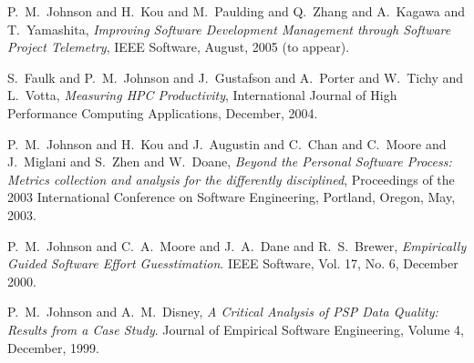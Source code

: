 \documentclass[11pt]{article}
\begin{document}
\begin{Publications: Closely Related}

\item P.~M.~Johnson and H.~Kou and M.~Paulding and Q.~Zhang and A.~Kagawa
and T.~Yamashita, {\em Improving Software Development Management through
Software Project Telemetry}, IEEE Software, August, 2005 (to appear).

\item S.~Faulk and P.~M.~Johnson and J.~Gustafson and A.~Porter and W.~Tichy
and L.~Votta, {\em Measuring HPC Productivity}, International Journal of
High Performance Computing Applications, December, 2004.


\item P.~M.~Johnson and H.~Kou and J.~Augustin and C.~Chan and C.~Moore and
J.~Miglani and S.~Zhen and W.~Doane, {\em Beyond the Personal Software
Process: Metrics collection and analysis for the differently disciplined},
Proceedings of the 2003 International Conference on Software Engineering,
Portland, Oregon, May, 2003.
  
\item P.~M.~Johnson and C.~A.~Moore and J.~A.~Dane and R.~S.~Brewer, {\em
    Empirically Guided Software Effort Guesstimation}.  IEEE Software, Vol.
  17, No. 6, December 2000.
  
\item P.~M.~Johnson and A.~M.~Disney, {\em A Critical Analysis of PSP Data
    Quality: Results from a Case Study}.  Journal of Empirical Software
  Engineering, Volume 4, December, 1999.

\end{Publications: Closely Related}
\end{document}
